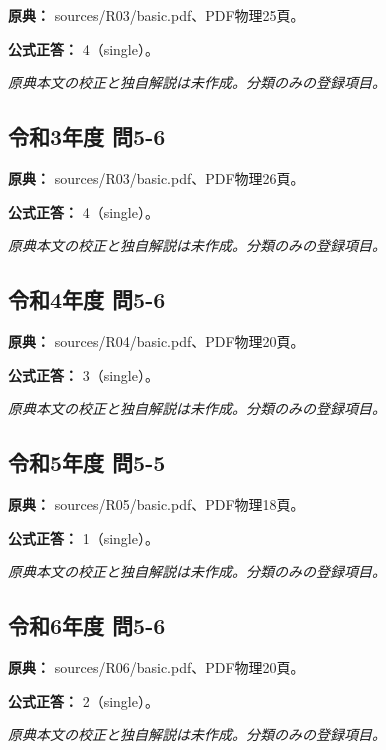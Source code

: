 \noindent\textbf{原典：} sources/R03/basic.pdf、PDF物理25頁。

\textbf{公式正答：} 4（single）。

\par\textit{原典本文の校正と独自解説は未作成。分類のみの登録項目。}

\subsection{令和3年度 問5-6}
\label{q:r03-reg-basic-5-6}

\noindent\textbf{原典：} sources/R03/basic.pdf、PDF物理26頁。

\textbf{公式正答：} 4（single）。

\par\textit{原典本文の校正と独自解説は未作成。分類のみの登録項目。}

\subsection{令和4年度 問5-6}
\label{q:r04-reg-basic-5-6}

\noindent\textbf{原典：} sources/R04/basic.pdf、PDF物理20頁。

\textbf{公式正答：} 3（single）。

\par\textit{原典本文の校正と独自解説は未作成。分類のみの登録項目。}

\subsection{令和5年度 問5-5}
\label{q:r05-reg-basic-5-5}

\noindent\textbf{原典：} sources/R05/basic.pdf、PDF物理18頁。

\textbf{公式正答：} 1（single）。

\par\textit{原典本文の校正と独自解説は未作成。分類のみの登録項目。}

\subsection{令和6年度 問5-6}
\label{q:r06-reg-basic-5-6}

\noindent\textbf{原典：} sources/R06/basic.pdf、PDF物理20頁。

\textbf{公式正答：} 2（single）。

\par\textit{原典本文の校正と独自解説は未作成。分類のみの登録項目。}


